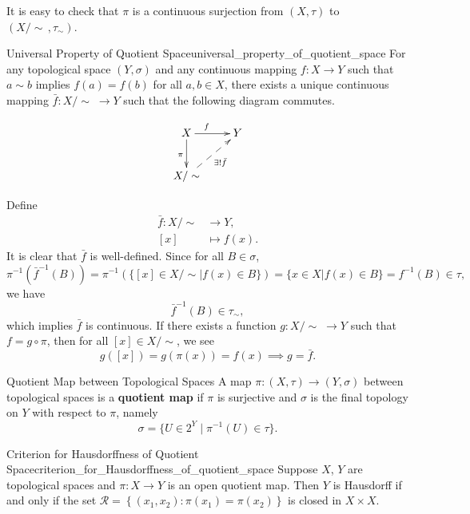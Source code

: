 \documentclass{report}
\begin{document}
It is easy to check that $\pi$ is a continuous surjection from $(X,\tau)$ to $(X/\sim\,,\tau_\sim)$.

\begin{proposition}{Universal Property of Quotient Space}{universal_property_of_quotient_space}
	For any topological space $(Y,\sigma)$ and any continuous mapping $f:X\to Y$ such that $a\sim b$ implies $f(a) = f(b)$ for all $a,b \in X$, there exists a unique continuous mapping $\bar{f}:X/\sim\;\to Y$ such that the following diagram commutes.

	\[\xymatrix{
		X\ar[r]^{f\quad}\ar[d]_{\pi}  &Y\\
		X/\sim\ar@{-->}[ru]_{\exists!\bar{f}}&
		}\]
\end{proposition}



\begin{prf}
	Define
	\begin{align*}
		\bar{f}:X/\sim & \longrightarrow Y, \\
		[x]            & \longmapsto f(x).
	\end{align*}
	It is clear that $\bar{f}$ is well-defined. Since for all $B\in \sigma$,
	\[
		\pi^{-1}\left(\bar{f}^{-1}(B)\right)=\pi^{-1}\left(\{[x]\in X/\sim| f(x)\in B\}\right)=\{x\in X| f(x)\in B\}=f^{-1}(B)\in \tau,
	\]
	we have
	\[
		\bar{f}^{-1}(B)\in \tau_\sim,
	\]
	which implies $\bar{f}$ is continuous. If there exists a function $g:X/\sim\;\to Y$ such that $f=g\circ\pi$, then for all $[x]\in X/\sim$, we see
	\[
		g([x])=g(\pi(x))=f(x)\implies g=\bar{f}.
	\]
\end{prf}

\begin{definition}{Quotient Map between Topological Spaces}{}
	A map $\pi:(X,\tau)\to (Y,\sigma)$ between topological spaces is a \textbf{quotient map} if $\pi$ is surjective and $\sigma$ is the final topology on $Y$ with respect to $\pi$, namely
	\[
	\sigma=\{U\in 2^Y\mid \pi^{-1}(U)\in \tau\}.
	\]
\end{definition}

\begin{proposition}{Criterion for Hausdorffness of Quotient Space}{criterion_for_Hausdorffness_of_quotient_space}
	Suppose $X$, $Y$ are topological spaces and $\pi: X \rightarrow Y$ is an open quotient map. Then $Y$ is Hausdorff if and only if the set $\mathcal{R}=\left\{\left(x_1, x_2\right): \pi\left(x_1\right)=\pi\left(x_2\right)\right\}$ is closed in $X \times X$.
\end{proposition}
\end{document}
